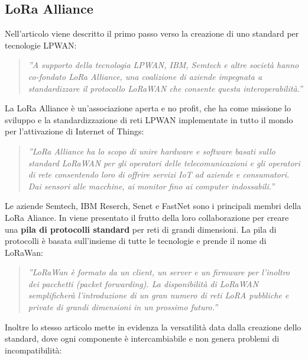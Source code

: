 \documentclass[a4paper]{report} %
\begin{document}
\subsection{LoRa Alliance}
Nell'articolo \cite{art:rif.26} viene descritto il primo passo verso la creazione di uno standard per tecnologie LPWAN:
\begin{quote}
	\textit{''A supporto della tecnologia LPWAN, IBM, Semtech e altre società hanno co-fondato LoRa Alliance, una coalizione di aziende impegnata a standardizzare il protocollo LoRaWAN che consente questa interoperabilità.''}
\end{quote}
La LoRa Alliance è un’associazione aperta e no profit, che ha come missione lo sviluppo e la standardizzazione di reti LPWAN implementate in tutto il mondo per l’attivazione di Internet of Things:
\begin{quote}
	\textit{''LoRa Alliance ha lo scopo di unire hardware e software basati sullo standard LoRaWAN per gli operatori delle telecomunicazioni e gli operatori di rete consentendo loro di offrire servizi IoT ad aziende e consumatori. Dai sensori alle macchine, ai monitor fino ai computer indossabili.''}
\end{quote}
Le aziende Semtech, IBM Reserch, Senet e FastNet sono i principali membri della LoRa Aliance. In \cite{art:rif.23} viene presentato il frutto della loro collaborazione per creare una \textbf{pila di protocolli standard} per reti di grandi dimensioni. La pila di protocolli è basata sull'insieme di tutte le tecnologie e prende il nome di LoRaWan:
\begin{quote}
	\textit{''LoRaWan è formato da un client, un server e un firmware per l'inoltro dei pacchetti (packet forwarding). La disponibilità di LoRaWAN semplificherà l'introduzione di un gran numero di reti LoRA pubbliche e private di grandi dimensioni in un prossimo futuro.''}
\end{quote}
Inoltre lo stesso articolo mette in evidenza la versatilità data dalla creazione dello standard, dove ogni componente è intercambiabile e non genera problemi di incompatibilità:
\end{document}
